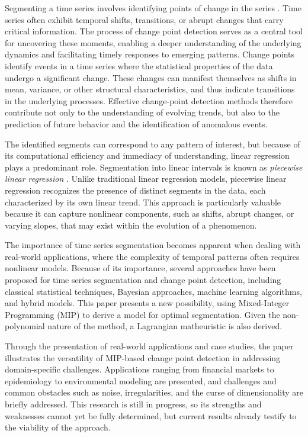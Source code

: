 \documentclass[runningheads]{llncs}
\begin{document}
Segmenting a time series involves identifying points of change in the series \cite{AC17} \cite{TOV20}. Time series often exhibit temporal shifts, transitions, or abrupt changes that carry critical information. The process of change point detection serves as a central tool for uncovering these moments, enabling a deeper understanding of the underlying dynamics and facilitating timely responses to emerging patterns.
Change points identify events in a time series where the statistical properties of the data undergo a significant change. These changes can manifest themselves as shifts in mean, variance, or other structural characteristics, and thus indicate transitions in the underlying processes. Effective change-point detection methods therefore contribute not only to the understanding of evolving trends, but also to the prediction of future behavior and the identification of anomalous events.

The identified segments can correspond to any pattern of interest, but because of its computational efficiency and immediacy of understanding, linear regression plays a predominant role. Segmentation into linear intervals is known as {\it piecewise linear regression} \cite{KCHP02}. Unlike traditional linear regression models, piecewise linear regression recognizes the presence of distinct segments in the data, each characterized by its own linear trend. This approach is particularly valuable because it can capture nonlinear components, such as shifts, abrupt changes, or varying slopes, that may exist within the  evolution of a phenomenon.

The importance of time series segmentation becomes apparent when dealing with real-world applications, where the complexity of temporal patterns often requires nonlinear models. Because of its importance, several approaches have been proposed for time series segmentation and change point detection, including classical statistical techniques, Bayesian approaches, machine learning algorithms, and hybrid models. This paper presents a new possibility, using Mixed-Integer Programming (MIP) to derive a model for optimal segmentation. Given the non-polynomial nature of the method, a Lagrangian matheuristic is also derived.

Through the presentation of real-world applications and case studies, the paper illustrates the versatility of MIP-based change point detection in addressing domain-specific challenges. Applications ranging from financial markets to epidemiology to environmental modeling are presented, and challenges and common obstacles such as noise, irregularities, and the curse of dimensionality are briefly addressed. This research is still in progress, so its strengths and weaknesses cannot yet be fully determined, but current results already testify to the viability of the approach.
\end{document}
